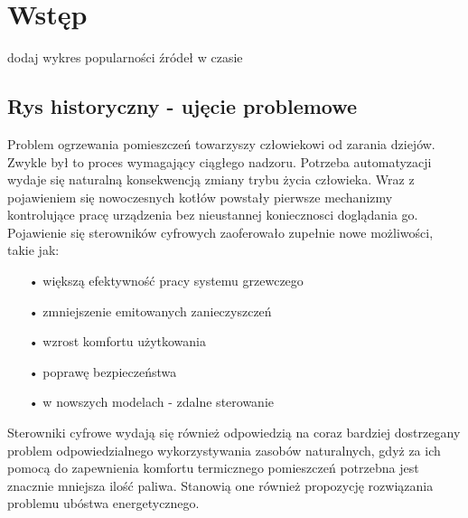 \documentclass[12pt]{report}
\begin{document}
 \begin{titlepage}
 \vspace{0.1\textheight}
 \bigskip
 \vspace{0.3\textheight}
 \par

 \vspace{0.1\textheight}
 \end{titlepage}


 \tableofcontents


 \chapter{Wstęp}
dodaj wykres popularności źródeł w czasie
 \section{Rys historyczny - ujęcie problemowe}
 Problem ogrzewania pomieszczeń towarzyszy człowiekowi od zarania dziejów. Zwykle był to proces wymagający ciągłego nadzoru. Potrzeba automatyzacji wydaje się naturalną konsekwencją zmiany trybu życia człowieka. Wraz z pojawieniem się nowoczesnych kotłów powstały pierwsze mechanizmy kontrolujące pracę urządzenia bez nieustannej koniecznosci doglądania go.
 Pojawienie się sterowników cyfrowych zaoferowało zupełnie nowe możliwości, takie jak:
  \begin{enumerate}
 \item[•] większą efektywność pracy systemu grzewczego
 \item[•] zmniejszenie emitowanych zanieczyszczeń
 \item[•] wzrost komfortu użytkowania
 \item[•] poprawę bezpieczeństwa
 \item[•] w nowszych modelach - zdalne sterowanie
  \end{enumerate}
 Sterowniki cyfrowe wydają się również odpowiedzią na coraz bardziej dostrzegany problem odpowiedzialnego wykorzystywania zasobów naturalnych, gdyż za ich pomocą do zapewnienia komfortu termicznego pomieszczeń potrzebna jest znacznie mniejsza ilość paliwa. Stanowią one również propozycję rozwiązania problemu ubóstwa energetycznego.
 
\end{document}
